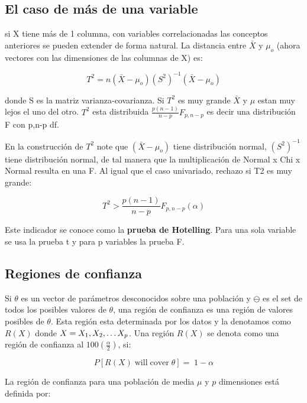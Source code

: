 \documentclass[
]{article}
\begin{document}
\subsection{El caso de más de una
variable}\label{el-caso-de-muxe1s-de-una-variable}

si X tiene más de 1 columna, con variables correlacionadas las conceptos
anteriores se pueden extender de forma natural. La distancia entre
\(\bar{X}\) y \(\mu_{o}\) (ahora vectores con las dimensiones de las
columnas de X) es:

\[ 
T^2 =n\left(\bar{X} -\mu_o \right){\left(S^2 \right)}^{-1} \left(\bar{X} -\mu_o \right) 
\]

donde S es la matriz varianza-covarianza. Si \(T^2\) es muy grande
\(\bar{X}\) y \(\mu\) estan muy lejos el uno del otro. \(T^2\) esta
distribuida \(\frac{p\left(n-1\right)}{n-p}F_{p,n-p}\) es decir una
distribución F con p,n-p df.

En la construcción de \(T^2\) note que \(\left(\bar{X} -\mu_o \right)\)
tiene distribución normal, \({\left(S^2 \right)}^{-1}\) tiene
distribución normal, de tal manera que la multiplicación de Normal x Chi
x Normal resulta en una F. Al igual que el caso univariado, rechazo si
T2 es muy grande:

\[ 
T^2 > \frac{p\left(n-1\right)}{n-p}F_{p,n-p} \left(\alpha \right) 
\]

Este indicador se conoce como la \textbf{prueba de Hotelling}. Para una
sola variable se usa la prueba t y para p variables la prueba F.

\subsection{Regiones de confianza}\label{regiones-de-confianza}

Si \(\theta\) es un vector de parámetros desconocidos sobre una
población y \(\ominus\) es el set de todos los posibles valores de
\(\theta\), una región de confianza es una región de valores posibles de
\(\theta\). Esta región esta determinada por los datos y la denotamos
como \(R(X)\) donde \(X=X_1 ,X_2 ,\ldotp \ldotp \ldotp X_p\). Una región
\(R(X)\) se denota como una región de confianza al
\(100\left(\frac{\alpha }{2}\right)\), si:

\[ 
P\left\lbrack R\left(X\right)\;\mathrm{will}\;\mathrm{cover}\;\theta \right\rbrack =\;1-\alpha
\]

La región de confianza para una población de media \(\mu\) y \(p\)
dimensiones está definida por:
\end{document}
